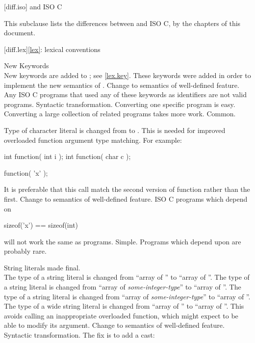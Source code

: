 
[diff.iso]{\Java{} and ISO C}

\pnum
{}%
This subclause lists the differences between \Java{} and
ISO C, by the chapters of this document.

[diff.lex]{\ref{lex}: lexical conventions}

\change New Keywords\\
New keywords are added to \Java{};
see \ref{lex.key}.
\rationale
These keywords were added in order to implement the new
semantics of \Java{}.
\effect
Change to semantics of well-defined feature.
Any ISO C programs that used any of these keywords as identifiers
are not valid \Java{} programs.
\difficulty
Syntactic transformation.
Converting one specific program is easy.
Converting a large collection
of related programs takes more work.
\howwide
Common.

\change Type of character literal is changed from  to .
\rationale
This is needed for improved overloaded function argument type
matching.
For example:

\begin{codeblock}
int function( int i );
int function( char c );

function( 'x' );
\end{codeblock}

It is preferable that this call match the second version of
function rather than the first.
\effect
Change to semantics of well-defined feature.
ISO C programs which depend on

\begin{codeblock}
sizeof('x') == sizeof(int)
\end{codeblock}

will not work the same as \Java{} programs.
\difficulty
Simple.
\howwide
Programs which depend upon  are probably rare.

\change String literals made final.\\
The type of a string literal is changed
from ``array of ''
to ``array of ''.
The type of a  string literal is changed
from ``array of \textit{some-integer-type}''
to ``array of ''.
The type of a  string literal is changed
from ``array of \textit{some-integer-type}''
to ``array of ''.
The type of a wide string literal is changed
from ``array of ''
to ``array of ''.
\rationale
This avoids calling an inappropriate overloaded function,
which might expect to be able to modify its argument.
\effect
Change to semantics of well-defined feature.
\difficulty
Syntactic transformation. The fix is to add a cast:

